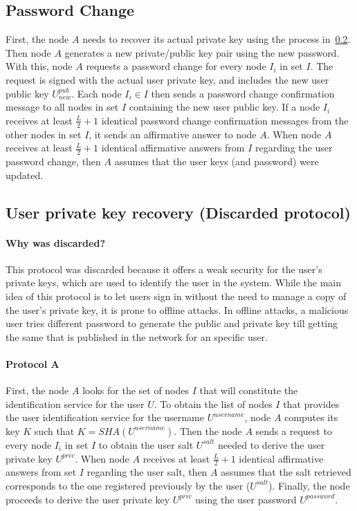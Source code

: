 \subsection{Password Change}

First, the node $A$ needs to recover its actual private key using the process
in~\ref{sec:private_key_recovery}. Then node $A$ generates a new private/public
key pair using the new password.  With this, node $A$ requests a
password change for every node $I_i$ in set $I$. The request is signed with the
actual user private key, and includes the new user public key $U^{pub}_{new}$.
Each node $I_i \in I$ then sends a password change confirmation message to all nodes
in set $I$ containing the new user public key. If a node $I_i$ receives at
least $\frac{L}{2} + 1$ identical password change confirmation messages from
the other nodes in set $I$, it sends an affirmative answer to node $A$.
 When node $A$ receives at least $\frac{L}{2} + 1$ identical affirmative
answers from $I$ regarding the user password change, then $A$ assumes that the
user keys (and password) were updated.

\subsection{User private key recovery (Discarded protocol)}
\label{sec:private_key_recovery}
\paragraph{Why was discarded?}
This protocol was discarded because it offers a weak security for the user's
private keys, which are used to identify the user in the system.  While the main idea
of this protocol is to let users sign in without the need to
manage a copy of the user's private key, it is prone to offline attacks. In
offline attacks, a malicious user tries different password to generate the
public and private key till getting the same that is published in the network
for an specific user.

\paragraph{Protocol A}

First, the node $A$ looks for the set of nodes $I$ that will constitute the
identification service for the user $U$.
To obtain the list of nodes $I$ that provides the user identification service for
the username $U^{username}$, node $A$ computes its key $K$ such that $K =
SHA(U^{username})$. 
Then the node $A$ sends a request to every node $I_i$ in set $I$ to obtain the user
salt $U^{salt}$ needed to derive the user private key $U^{priv}$.
 When node $A$ receives at least $\frac{L}{2} + 1$ identical affirmative answers from
set $I$ regarding the user salt, then $A$ assumes that the salt retrieved
corresponds to the one registered previously by the user ($U^{salt}$). Finally,
the node proceeds to derive the user private key $U^{priv}$ using the user password $U^{password}$.


